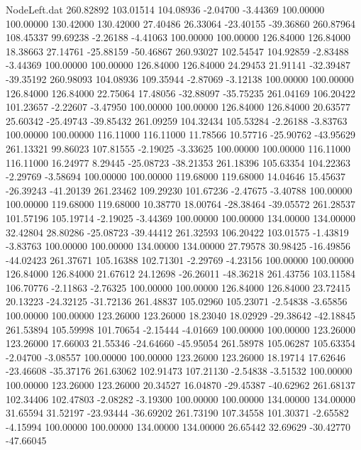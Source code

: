 \begin{filecontents}{NodeLeft.dat}
 260.82892  103.01514  104.08936    -2.04700   -3.44369  100.00000  100.00000  130.42000  130.42000   27.40486   26.33064  -23.40155  -39.36860
 260.87964  108.45337   99.69238    -2.26188   -4.41063  100.00000  100.00000  126.84000  126.84000   18.38663   27.14761  -25.88159  -50.46867
 260.93027  102.54547  104.92859    -2.83488   -3.44369  100.00000  100.00000  126.84000  126.84000   24.29453   21.91141  -32.39487  -39.35192
 260.98093  104.08936  109.35944    -2.87069   -3.12138  100.00000  100.00000  126.84000  126.84000   22.75064   17.48056  -32.88097  -35.75235
 261.04169  106.20422  101.23657    -2.22607   -3.47950  100.00000  100.00000  126.84000  126.84000   20.63577   25.60342  -25.49743  -39.85432
 261.09259  104.32434  105.53284    -2.26188   -3.83763  100.00000  100.00000  116.11000  116.11000   11.78566   10.57716  -25.90762  -43.95629
 261.13321   99.86023  107.81555    -2.19025   -3.33625  100.00000  100.00000  116.11000  116.11000   16.24977    8.29445  -25.08723  -38.21353
 261.18396  105.63354  104.22363    -2.29769   -3.58694  100.00000  100.00000  119.68000  119.68000   14.04646   15.45637  -26.39243  -41.20139
 261.23462  109.29230  101.67236    -2.47675   -3.40788  100.00000  100.00000  119.68000  119.68000   10.38770   18.00764  -28.38464  -39.05572
 261.28537  101.57196  105.19714    -2.19025   -3.44369  100.00000  100.00000  134.00000  134.00000   32.42804   28.80286  -25.08723  -39.44412
 261.32593  106.20422  103.01575    -1.43819   -3.83763  100.00000  100.00000  134.00000  134.00000   27.79578   30.98425  -16.49856  -44.02423
 261.37671  105.16388  102.71301    -2.29769   -4.23156  100.00000  100.00000  126.84000  126.84000   21.67612   24.12698  -26.26011  -48.36218
 261.43756  103.11584  106.70776    -2.11863   -2.76325  100.00000  100.00000  126.84000  126.84000   23.72415   20.13223  -24.32125  -31.72136
 261.48837  105.02960  105.23071    -2.54838   -3.65856  100.00000  100.00000  123.26000  123.26000   18.23040   18.02929  -29.38642  -42.18845
 261.53894  105.59998  101.70654    -2.15444   -4.01669  100.00000  100.00000  123.26000  123.26000   17.66003   21.55346  -24.64660  -45.95054
 261.58978  105.06287  105.63354    -2.04700   -3.08557  100.00000  100.00000  123.26000  123.26000   18.19714   17.62646  -23.46608  -35.37176
 261.63062  102.91473  107.21130    -2.54838   -3.51532  100.00000  100.00000  123.26000  123.26000   20.34527   16.04870  -29.45387  -40.62962
 261.68137  102.34406  102.47803    -2.08282   -3.19300  100.00000  100.00000  134.00000  134.00000   31.65594   31.52197  -23.93444  -36.69202
 261.73190  107.34558  101.30371    -2.65582   -4.15994  100.00000  100.00000  134.00000  134.00000   26.65442   32.69629  -30.42770  -47.66045

\end{filecontents}
